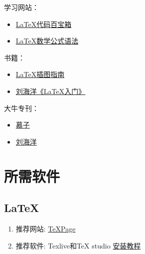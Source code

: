\documentclass[withoutpreface,bwprint]{cumcmthesis} %
\begin{document}
\begin{multicols}{3}
学习网站：

\begin{itemize}
    \item \href{https://flowus.cn/latex/share/66110e84-b24a-4cd5-b8a7-2ba2afb35a30}{\LaTeX 代码百宝箱}
        \item \href{http://www.uinio.com/Math/LaTex/}{\LaTeX 数学公式语法}

\end{itemize}

书籍：
\begin{itemize}
    \item \href{https://cozier-1315026820.cos.ap-guangzhou.myqcloud.com/epslatex-cn.pdf}{\LaTeX 插图指南}
    \item \href{https://cozier-1315026820.cos.ap-guangzhou.myqcloud.com/%E5%88%98%E6%B5%B7%E6%B4%8B%E3%80%8ALaTeX%E5%85%A5%E9%97%A8%E3%80%8B.pdf}{刘海洋《LaTeX入门》}
\end{itemize}

大牛专刊：
\begin{itemize}
    \item \href{https://www.zhihu.com/people/muzzi/answers}{慕子}
    \item \href{https://www.zhihu.com/people/liu-haiyang}{刘海洋}
\end{itemize}
\end{multicols}

\newpage
\tableofcontents
\newpage
\section{所需软件}
\subsection{\LaTeX}
\begin{enumerate}
    \item 推荐网站: \href{https://texpage.com/}{TeXPage}
    \item 推荐软件: Texlive和TeX studio 
    \href{https://blog.csdn.net/Mikchy/article/details/94448707?ops_request_misc=%257B%2522request%255Fid%2522%253A%2522167843849716800182737093%2522%252C%2522scm%2522%253A%252220140713.130102334..%2522%257D&request_id=167843849716800182737093&biz_id=0&utm_medium=distribute.pc_search_result.none-task-blog-2~all~top_positive~default-1-94448707-null-null.142^v73^insert_down4,201^v4^add_ask,239^v2^insert_chatgpt&utm_term=latex%E5%AE%89%E8%A3%85&spm=1018.2226.3001.4187}{安装教程}
\end{enumerate}
\end{document}
